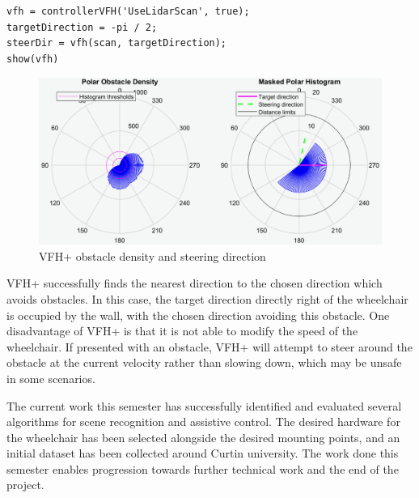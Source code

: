 \begin{verbatim}
vfh = controllerVFH('UseLidarScan', true);
targetDirection = -pi / 2;
steerDir = vfh(scan, targetDirection);
show(vfh)
\end{verbatim}

\begin{figure}[H]
    \centering
    \includegraphics[width=0.65\linewidth]{images/vfh_controller.png}
    \caption{VFH+ obstacle density and steering direction}
    \label{fig:vfh_controller}
\end{figure}

VFH+ successfully finds the nearest direction to the chosen direction which avoids obstacles.
In this case, the target direction directly right of the wheelchair is
occupied by the wall, with the chosen direction avoiding this obstacle.
One disadvantage of VFH+ is that it is not able to modify the speed of the wheelchair.
If presented with an obstacle, VFH+ will attempt to steer around the obstacle at the current velocity rather than
slowing down, which may be unsafe in some scenarios.

The current work this semester has successfully identified and evaluated several algorithms for scene recognition and assistive control.
The desired hardware for the wheelchair has been selected alongside the desired mounting points, and an initial dataset has
been collected around Curtin university.
The work done this semester enables progression towards further technical work and the end of the project.
